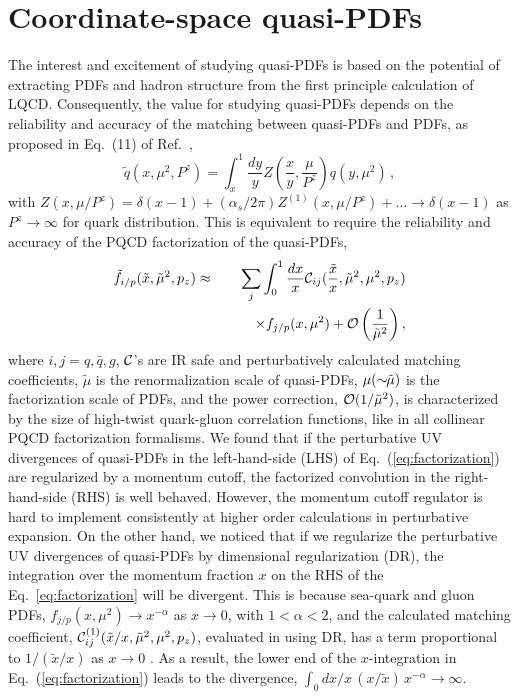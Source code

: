 \section{Coordinate-space quasi-PDFs}
\label{sec:def}

The interest and excitement of studying quasi-PDFs is based on the potential of extracting PDFs and hadron structure from the first principle calculation of LQCD.  Consequently, the value for studying quasi-PDFs depends on the reliability and accuracy of the matching between quasi-PDFs and PDFs, as proposed in Eq.~(11) of Ref.~\cite{Ji:2013dva},
\begin{equation}
\label{eq:matching_ji}
\tilde{q}(x,\mu^2,P^z) = \int_x^1 \frac{dy}{y} Z\left(\frac{x}{y},\frac{\mu}{P^z}\right) q(y,\mu^2) \, ,
\end{equation}
with $Z(x,\mu/P^z)=\delta(x-1)+(\alpha_s/2\pi)Z^{(1)}(x,\mu/P^z) +\dots \to \delta(x-1)$ as $P^z\to \infty$ for quark distribution.  This is equivalent to require the reliability and accuracy of the PQCD factorization of the quasi-PDFs,
\begin{eqnarray}
\label{eq:factorization}
\tilde{f}_{i/p}(\tilde{x},\tilde{\mu}^2,p_z) & \approx &
\sum_{j} \int_0^1 \frac{dx}{x} {\cal C}_{ij}(\frac{\tilde{x}}{x},\tilde{\mu}^2,\mu^2,p_z)
\nonumber \\
&& \hskip 0.3in
\times f_{j/p}(x,\mu^2) + {\cal O}\left(\frac{1}{\tilde{\mu}^2}\right),
\end{eqnarray}
where $i, j =q, \bar{q}, g$, ${\cal C}$'s are IR safe and perturbatively calculated matching coefficients,  $\tilde{\mu}$ is the renormalization scale of quasi-PDFs, $\mu (\sim{\hskip -0.05in}\tilde{\mu})$ is the factorization scale of PDFs, and the power correction, ${\cal O}(1/\tilde{\mu}^2)$, is characterized by the size of high-twist quark-gluon correlation functions, like in all collinear PQCD factorization formalisms. We found that if the perturbative UV divergences of quasi-PDFs in the left-hand-side (LHS) of Eq.~(\ref{eq:factorization}) are regularized by a momentum cutoff, the factorized convolution in the right-hand-side (RHS) is well behaved. However, the momentum cutoff regulator is hard to implement consistently at higher order calculations in perturbative expansion.  On the other hand, we noticed that if we regularize the perturbative UV divergences of quasi-PDFs by dimensional regularization (DR), the integration over the momentum fraction $x$ on the RHS of the Eq.~\eqref{eq:factorization} will be divergent. This is because sea-quark and gluon PDFs, $f_{j/p}(x,\mu^2) \to x^{-\alpha}$ as $x\to0$, with $1<\alpha<2$, and the calculated matching coefficient, ${\cal C}^{(1)}_{ij}(\tilde{x}/x,\tilde{\mu}^2,\mu^2,p_z)$, evaluated in using DR, has a term proportional to $1/(\tilde{x}/x)$ as $x\to 0$  \cite{Ma:2014jla,Xiong:2013bka}.  As a result, the lower end of the $x$-integration in Eq.~(\ref{eq:factorization}) leads to the divergence, $\int_0 dx/x\, (x/\tilde{x})\, x^{-\alpha} \to \infty$.

